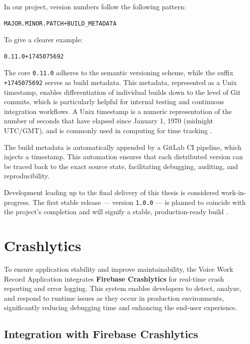 \documentclass[
  digital,     %
  oneside,     %
  nosansbold,  %
  nocolorbold, %
  lof,         %
  lot,         %
]{fithesis4}
\begin{document}
In our project, version numbers follow the following pattern:

\begin{verbatim}
MAJOR.MINOR.PATCH+BUILD_METADATA
\end{verbatim}

To give a clearer example:

\begin{verbatim}
0.11.0+1745075692
\end{verbatim}


The core \texttt{0.11.0} adheres to the semantic versioning scheme, while the suffix \texttt{+1745075692} serves as build metadata. This metadata, represented as a Unix timestamp, enables differentiation of individual builds down to the level of Git commits, which is particularly helpful for internal testing and continuous integration workflows. A Unix timestamp is a numeric representation of the number of seconds that have elapsed since January 1, 1970 (midnight \gls{UTC}/\gls{GMT}), and is commonly used in computing for time tracking \cite{mdnUnixTime}.

The build metadata is automatically appended by a GitLab \gls{CI} pipeline, which injects a timestamp. This automation ensures that each distributed version can be traced back to the exact source state, facilitating debugging, auditing, and reproducibility.

Development leading up to the final delivery of this thesis is considered work-in-progress. The first stable release — version \texttt{1.0.0} — is planned to coincide with the project's completion and will signify a stable, production-ready build \cite{semver}.

\section{Crashlytics}

To ensure application stability and improve maintainability, the Voice Work Record Application integrates \textbf{Firebase Crashlytics} for real-time crash reporting and error logging. This system enables developers to detect, analyze, and respond to runtime issues as they occur in production environments, significantly reducing debugging time and enhancing the end-user experience.

\subsection{Integration with Firebase Crashlytics}
\end{document}
